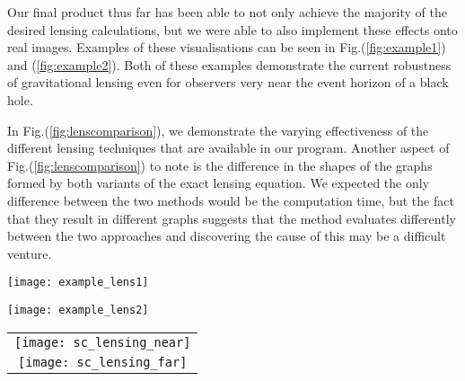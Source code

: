 \documentclass{standalone}
\begin{document}
Our final product thus far has been able to not only achieve the majority of the desired lensing calculations, but we were able to also implement these effects onto real images.
Examples of these visualisations can be seen in Fig.(\ref{fig:example1}) and (\ref{fig:example2}).
Both of these examples demonstrate the current robustness of gravitational lensing even for observers very near the event horizon of a black hole.

In Fig.(\ref{fig:lenscomparison}), we demonstrate the varying effectiveness of the different lensing techniques that are available in our program.
Another aspect of Fig.(\ref{fig:lenscomparison}) to note is the difference in the shapes of the graphs formed by both variants of the exact lensing equation.
We expected the only difference between the two methods would be the computation time, but the fact that they result in different graphs suggests that the  method evaluates differently between the two approaches and discovering the cause of this may be a difficult venture.

\begin{figure*}
  \caption{\label{fig:example1}
    Final result of applying the explicit Schwarzschild lensing map on a sample image using a Schwarzschild space-time defined by $M=1.0$ and $r_O=10M$.
    In this example, one can easily see the problematic image tearing at the $\pi/2$ and $-\pi/2$ meridians.
  }
  \texttt{[image: example\_lens1]}
\end{figure*}

\begin{figure*}
  \caption{\label{fig:example2}
    Second example of a generated Schwarzschild lensing map using the same space-time as in Fig.(\ref{fig:example1}) but at a radius of $r_O=\SI{2.5}{\kilo\meter}$, which is significantly closer to the event horizon.
    The accuracy of this result hasn't yet been scrutinized, however the overall converging of the observer's sky to the point at $\phi=0$ is to be expected.
  }
  \texttt{[image: example\_lens2]}
\end{figure*}

\begin{figure*}
  \caption{\label{fig:lenscomparison}
    Comparison between the three levels of generality in the Schwarzschild lensing equation, with the resultant angles shifted vertically by a factor of $\pi$ for clarity.
    The first graph accentuates the differences between the methods near the singularity, while the latter graph shows how the errors of the first decrease as the radius of the observer increases.
  }
  \begin{tabular}{c}
    \texttt{[image: sc\_lensing\_near]}\\
    \texttt{[image: sc\_lensing\_far]}
  \end{tabular}
\end{figure*}
\end{document}
